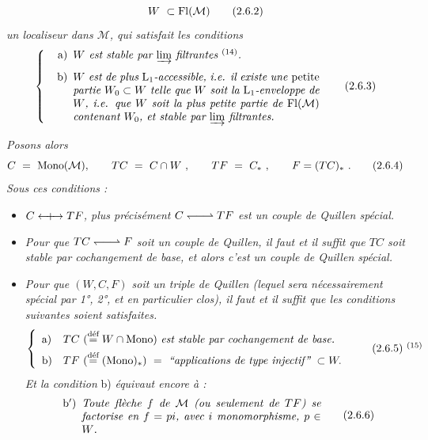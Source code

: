\[ W \ \subset \mathrm{Fl}(\mathcal{M}) \tag*{(2.6.2)} \]
\textit{un localiseur dans $\mathcal{M}$, qui satisfait les conditions}
\[ \left\{ \begin{minipage}{0.72\textwidth}\itshape
\begin{itemize}[leftmargin=2.5em]
\item[\upshape a)] $W$ est stable par $\varinjlim$ filtrantes $^{\textup{(14)}}$.
\item[\upshape b)] $W$ est de plus $\mathrm{L}_1$-accessible, i.e. il existe une \textup{petite} partie $W_0 \subset W$ telle que $W$ soit la $\mathrm{L}_1$-enveloppe de $W$, i.e. que $W$ soit la plus petite partie de $\Fl(\mathcal{M})$ contenant $W_0$, et stable par $\varinjlim$ filtrantes. %
\end{itemize}
\end{minipage}\right. \tag*{(2.6.3)} \]


\textit{Posons alors}
\[ C \ = \ \mathrm{Mono}(\mathcal{M}), \qquad TC \ = \ C\cap W\ , \qquad TF \ = \ C_*\ , \qquad F = (TC)_*\ . \tag*{(2.6.4)} \]
\textit{Sous ces conditions :}
\begin{itemize}[leftmargin=2.5em]
\item[1°)] \textit{$C \mathrel{\leftarrow\mkern-9mu{+}\mkern-9mu\rightarrow} TF$, plus précisément $C \qpair TF$ est un couple de Quillen spécial.} %
\item[2°)] \textit{Pour que $TC \qpair F$ soit un couple de Quillen, il faut et il suffit que $TC$ soit stable par cochangement de base, et alors c'est un couple de Quillen spécial.} %
\item[3°)] \textit{Pour que $(W,C,F)$ soit un triple de Quillen (lequel sera nécessairement spécial par \textup{1°, 2°}, et en particulier clos), il faut et il suffit que les conditions suivantes soient satisfaites.}
\[ \left\{ \begin{array}{ll}
\text{a)} & TC\ (\deq W\cap\Mono)\ \text{\itshape est stable par cochangement de base.}\\[1ex]
\text{b)} & TF\ (\deq (\Mono)_*) \ = \ \text{\itshape “applications de type injectif”}\ \subset W.
\end{array}\right. \tag*{(2.6.5)~$^{(15)}$} \]
\textit{Et la condition} b) \textit{équivaut encore à :}
\[ \begin{minipage}{0.7\textwidth}
\begin{itemize}[leftmargin=2.5em]
\item[b$'$)] \textit{Toute flèche $f$ de $\mathcal{M}$ (ou seulement de $TF$) se factorise en $f = pi$, avec $i$ monomorphisme, $p \in W$.}
\end{itemize}
\end{minipage} \tag*{(2.6.6)} \]
\end{itemize}

